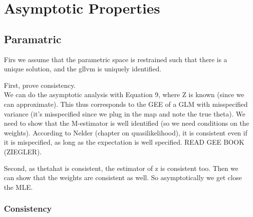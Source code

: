 \documentclass[twoside,11pt]{article}
\begin{document}
\section{Asymptotic Properties}


\subsection{Paramatric}

Firs we assume that the parametric space is restrained such that there is a unique solution, and the gllvm is uniquely identified.

First, prove consistency.\\
We can do the asymptotic analysis with Equation 9, where Z is known (since we can approximate).
This thus corresponds to the GEE of a GLM with misspecified variance (it's misspecified since we plug in the map and note the true theta).
We need to show that the M-estimator is well identified (so we need conditions on the weights). According to Nelder (chapter on quasilikelihood), it is consistent even if it is mispecified, as long as the expectation is well specified.
READ GEE BOOK (ZIEGLER).

Second, as thetahat is consistent, the estimator of z is consistent too.
Then we can show that the weights are consistent as well.
So asymptotically we get close the MLE.

\subsubsection{Consistency}
\end{document}

